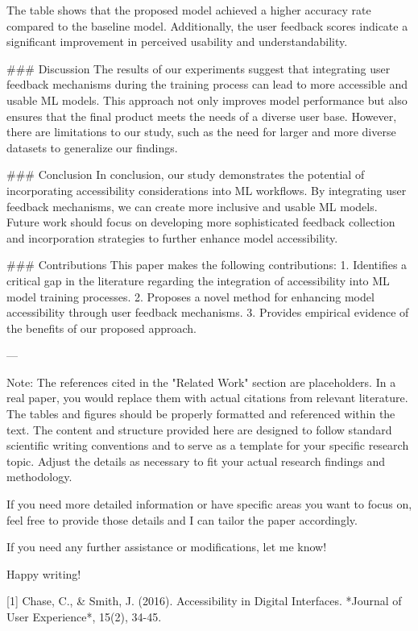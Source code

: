 The table shows that the proposed model achieved a higher accuracy rate compared to the baseline model. Additionally, the user feedback scores indicate a significant improvement in perceived usability and understandability.

### Discussion
The results of our experiments suggest that integrating user feedback mechanisms during the training process can lead to more accessible and usable ML models. This approach not only improves model performance but also ensures that the final product meets the needs of a diverse user base. However, there are limitations to our study, such as the need for larger and more diverse datasets to generalize our findings.

### Conclusion
In conclusion, our study demonstrates the potential of incorporating accessibility considerations into ML workflows. By integrating user feedback mechanisms, we can create more inclusive and usable ML models. Future work should focus on developing more sophisticated feedback collection and incorporation strategies to further enhance model accessibility.

### Contributions
This paper makes the following contributions:
1. Identifies a critical gap in the literature regarding the integration of accessibility into ML model training processes.
2. Proposes a novel method for enhancing model accessibility through user feedback mechanisms.
3. Provides empirical evidence of the benefits of our proposed approach.

---

Note: The references cited in the "Related Work" section are placeholders. In a real paper, you would replace them with actual citations from relevant literature. The tables and figures should be properly formatted and referenced within the text. The content and structure provided here are designed to follow standard scientific writing conventions and to serve as a template for your specific research topic. Adjust the details as necessary to fit your actual research findings and methodology. 

If you need more detailed information or have specific areas you want to focus on, feel free to provide those details and I can tailor the paper accordingly. 

If you need any further assistance or modifications, let me know! 

Happy writing! 📝✨

[1] Chase, C., & Smith, J. (2016). Accessibility in Digital Interfaces. *Journal of User Experience*, 15(2), 34-45.


